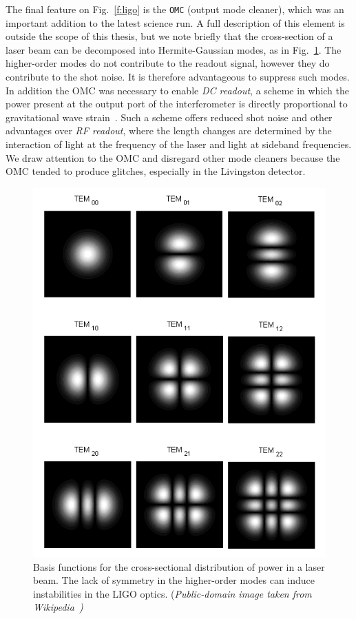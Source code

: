 The final feature on Fig.~\ref{f:ligo} is the \texttt{OMC} (output
mode cleaner), which was an important addition to the latest science
run.  A full description of this element is outside the scope of this
thesis, but we note briefly that the cross-section of a laser beam can
be decomposed into Hermite-Gaussian modes, as in
Fig.~\ref{f:hermite_gauss}.  The higher-order modes do not contribute
to the readout signal, however they do contribute to the shot noise.
It is therefore advantageous to suppress such modes.  In addition the
OMC was necessary to enable \emph{DC readout}, a scheme in which the
power present at the output port of the interferometer is directly
proportional to gravitational wave
strain~\cite{0264-9381-25-11-114030}.  Such a scheme offers reduced
shot noise and other advantages over \emph{RF readout}, where the
length changes are determined by the interaction of light at the
frequency of the laser and light at sideband frequencies.  We draw
attention to the OMC and disregard other mode cleaners because the OMC
tended to produce glitches, especially in the Livingston detector.
%
\begin{figure}
\includegraphics[width=\linewidth]{figures/detectors/TEMmn}
\caption[Laser modes]{ \label{f:hermite_gauss} Basis functions for the
cross-sectional distribution of power in a laser beam.  The lack of
symmetry in the higher-order modes can induce instabilities in the
LIGO optics. (\it{Public-domain image taken from
Wikipedia}~\cite{wikipedia:temmn}) } \end{figure}%

